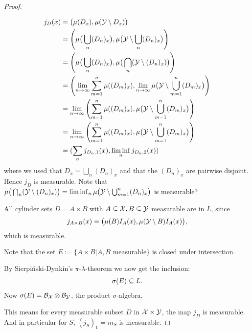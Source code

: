 \begin{proof}
\begin{enumerate}
    \begin{equation*}\begin{split}
    j_D(x) 
      &= \big(\mu(D_x),\mu(\mathcal{Y} \setminus D_x)\big) \\
      &= \left(\mu\big(\bigcup_n (D_n)_x\big),\mu\big(\mathcal{Y} \setminus \bigcup_n (D_n)_x\big)\right) \\
      &= \left(\mu\big(\bigcup_n (D_n)_x\big),\mu\big(\bigcap_n (\mathcal{Y} \setminus (D_n)_x)\big)\right) \\
      &= \left(\lim_{n\to\infty} \sum_{m=1}^n \mu((D_m)_x),\lim_{n\to\infty} \mu\big(\mathcal{Y} \setminus \bigcup_{m=1}^n (D_m)_x\big)\right) \\
      &= \lim_{n\to\infty} \left(\sum_{m=1}^n \mu((D_m)_x), \mu\big(\mathcal{Y} \setminus \bigcup_{m=1}^n (D_m)_x\big)\right) \\
      &= \lim_{n\to\infty} \left(\sum_{m=1}^n \mu((D_m)_x), \mu\big(\mathcal{Y} \setminus \bigcup_{m=1}^n (D_m)_x\big)\right) \\
      &= (\sum_n j_{D_n,1}(x), \liminf_n j_{D_n,2}(x))
    \end{split}\end{equation*}
    where we used that $D_x = \bigcup_n (D_n)_x$ and that the $(D_n)_x$ are pairwise disjoint.
    Hence $j_D$ is measurable.
    Note that $\mu\big(\bigcap_n (\mathcal{Y} \setminus (D_n)_x)\big) = \liminf_n \mu\big(\mathcal{Y} \setminus \bigcup_{m=1}^n (D_n)_x\big)$ is measurable?
\end{enumerate}

All cylinder sets $D = A \times B$ with $A \subseteq \mathcal{X},B \subseteq \mathcal{Y}$ measurable are in $L$, since
  $$j_{A\times B}(x) = \big(\mu(B) I_A(x),\mu(\mathcal{Y} \setminus B) I_A(x)\big),$$
which is measurable.

Note that the set $E:= \{ A \times B | A, B \text{ measurable} \}$ is closed under intersection.

By Sierpi\'nski-Dynkin's $\pi$-$\lambda$-theorem we now get the inclusion:
$$\sigma(E) \subseteq L.$$
Now $\sigma(E) = \mathcal{B}_{\mathcal{X}} \otimes \mathcal{B}_{\mathcal{Y}}$, the product $\sigma$-algebra.

This means for every measurable subset $D$ in $\mathcal{X} \times \mathcal{Y}$, the map $j_D$ is measurable.
And in particular for $S$, $(j_S)_1 = m_S$ is measurable.
\end{proof}


